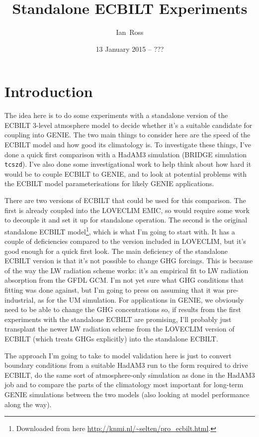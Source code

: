\documentclass[a4paper,11pt]{article}
\title{Standalone ECBILT Experiments}
\author{Ian~Ross}
\date{13 January 2015 -- ???}
\begin{document}
\maketitle

\section{Introduction}

The idea here is to do some experiments with a standalone version of
the ECBILT 3-level atmosphere model to decide whether it's a suitable
candidate for coupling into GENIE.  The two main things to consider
here are the speed of the ECBILT model and how good its climatology
is.  To investigate these things, I've done a quick first comparison
with a HadAM3 simulation (BRIDGE simulation \texttt{tcszd}).  I've
also done some investigational work to help think about how hard it
would be to couple ECBILT to GENIE, and to look at potential problems
with the ECBILT model parameterisations for likely GENIE applications.

There are two versions of ECBILT that could be used for this
comparison.  The first is already coupled into the LOVECLIM EMIC, so
would require some work to decouple it and set it up for standalone
operation.  The second is the original standalone ECBILT
model\footnote{Downloaded from here
  \url{http://knmi.nl/~selten/pro_ecbilt.html}.}, which is what I'm
going to start with.  It has a couple of deficiencies compared to the
version included in LOVECLIM, but it's good enough for a quick first
look.  The main deficiency of the standalone ECBILT version is that
it's not possible to change GHG forcings.  This is because of the way
the LW radiation scheme works: it's an empirical fit to LW radiation
absorption from the GFDL GCM.  I'm not yet sure what GHG conditions
that fitting was done against, but I'm going to press on assuming that
it was pre-industrial, as for the UM simulation.  For applications in
GENIE, we obviously need to be able to change the GHG concentrations
so, if results from the first experiments with the standalone ECBILT
are promising, I'll probably just transplant the newer LW radiation
scheme from the LOVECLIM version of ECBILT (which treats GHGs
explicitly) into the standalone ECBILT.

The approach I'm going to take to model validation here is just to
convert boundary conditions from a suitable HadAM3 run to the form
required to drive ECBILT, do the same sort of atmosphere-only
simulation as done in the HadAM3 job and to compare the parts of the
climatology most important for long-term GENIE simulations between the
two models (also looking at model performance along the way).
\end{document}
